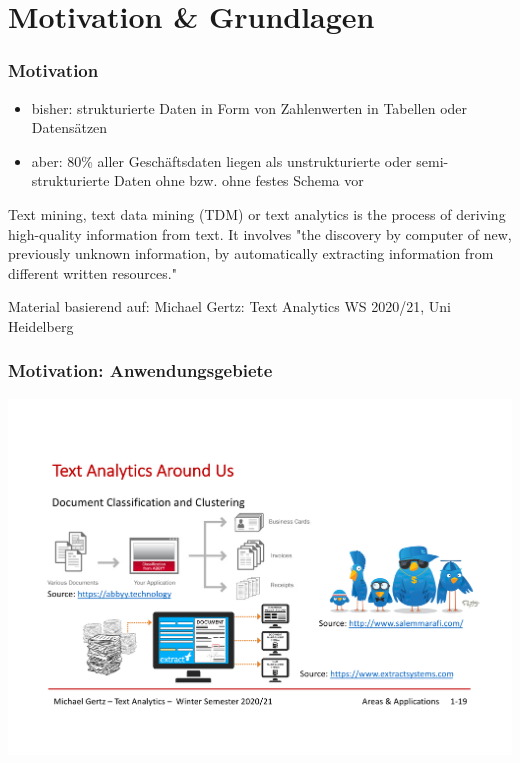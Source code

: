 \section{Motivation \& Grundlagen}

\begin{frame}
    \frametitle{Motivation}

    \begin{itemize}
        \item bisher: strukturierte Daten in Form von Zahlenwerten in Tabellen oder Datensätzen
        \item aber: 80\% aller Geschäftsdaten liegen als unstrukturierte oder semi-strukturierte Daten ohne bzw. ohne festes Schema vor
    \end{itemize}   

    \vspace*{1cm}
    {\small
    \begin{notebox}
    Text mining, text data mining (TDM) or text analytics is the process of deriving high-quality information from text. It involves "the discovery by computer of new, previously unknown information, by automatically extracting information from different written resources."\\
    \xspace [Source: Wikipedia]
    \end{notebox}
    }

    \small{Material basierend auf: Michael Gertz: Text Analytics WS 2020/21, Uni Heidelberg}

\end{frame}


\begin{frame}[c]
    \frametitle{Motivation: Anwendungsgebiete}

    \begin{center}
    \includegraphics[width=\textwidth]{fig8/motivation-1.pdf}
    \end{center}

\end{frame}

